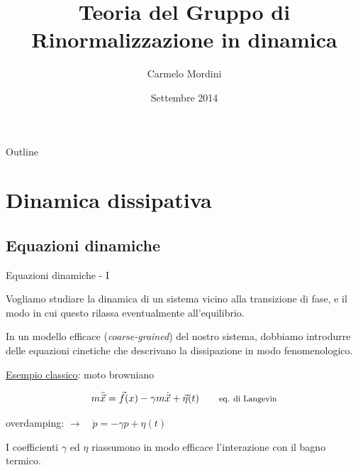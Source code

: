 \documentclass[10pt]{beamer}
\title{Teoria del Gruppo di Rinormalizzazione in dinamica}
\author[Carmelo Mordini]{Carmelo Mordini}
\date{\small{Settembre 2014}}
\begin{document}

\begin{frame}[plain]
\advance\textwidth2cm
\hsize\textwidth
\columnwidth\textwidth
  \titlepage
\end{frame}


\begin{frame}{Outline}
\transwipe[direction=270]
  \tableofcontents%
\end{frame}

\section{Dinamica dissipativa}
\subsection{Equazioni dinamiche}

\begin{frame}{Equazioni dinamiche - I}

Vogliamo studiare la dinamica di un sistema vicino alla transizione di fase, e il modo in cui questo rilassa eventualmente all'equilibrio.

In un modello efficace (\emph{coarse-grained}) del nostro sistema, dobbiamo introdurre delle equazioni cinetiche che descrivano la dissipazione in modo fenomenologico.
\pause
\vskip10pt

\underline{Esempio classico}: moto browniano

\begin{equation*}
 m\ddot{\vec x} = \vec f(x) - \gamma m \dot{\vec x} + \vec \eta(t) \qquad \text{\footnotesize eq. di Langevin}
\end{equation*}

\vskip10pt
overdamping: $\rightarrow \quad \dot p  = -\gamma p + \eta(t)$

I coefficienti $\gamma$ ed $\eta$ riassumono in modo efficace l'interazione con il bagno termico.
\end{frame}
\end{document}
